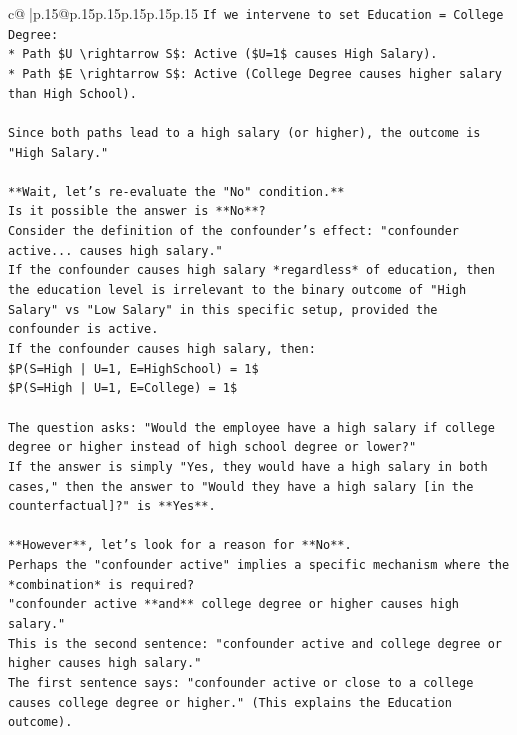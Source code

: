 \documentclass{article}
\begin{document}
{\begin{supertabular}{c@{$\;$}|p{.15\linewidth}@{}p{.15\linewidth}p{.15\linewidth}p{.15\linewidth}p{.15\linewidth}p{.15\linewidth}}
{{{\texttt{If we intervene to set Education = College Degree:} \\
\texttt{*   Path \$U \textbackslash{}rightarrow S\$: Active (\$U=1\$ causes High Salary).} \\
\texttt{*   Path \$E \textbackslash{}rightarrow S\$: Active (College Degree causes higher salary than High School).} \\
\\ 
\texttt{Since both paths lead to a high salary (or higher), the outcome is "High Salary."} \\
\\ 
\texttt{**Wait, let's re{-}evaluate the "No" condition.**} \\
\texttt{Is it possible the answer is **No**?} \\
\texttt{Consider the definition of the confounder's effect: "confounder active... causes high salary."} \\
\texttt{If the confounder causes high salary *regardless* of education, then the education level is irrelevant to the binary outcome of "High Salary" vs "Low Salary" in this specific setup, provided the confounder is active.} \\
\texttt{If the confounder causes high salary, then:} \\
\texttt{\$P(S=High | U=1, E=HighSchool) = 1\$} \\
\texttt{\$P(S=High | U=1, E=College) = 1\$} \\
\\ 
\texttt{The question asks: "Would the employee have a high salary if college degree or higher instead of high school degree or lower?"} \\
\texttt{If the answer is simply "Yes, they would have a high salary in both cases," then the answer to "Would they have a high salary {[}in the counterfactual{]}?" is **Yes**.} \\
\\ 
\texttt{**However**, let's look for a reason for **No**.} \\
\texttt{Perhaps the "confounder active" implies a specific mechanism where the *combination* is required?} \\
\texttt{"confounder active **and** college degree or higher causes high salary."} \\
\texttt{This is the second sentence: "confounder active and college degree or higher causes high salary."} \\
\texttt{The first sentence says: "confounder active or close to a college causes college degree or higher." (This explains the Education outcome).} \\
}}}
\end{supertabular}}
\end{document}
